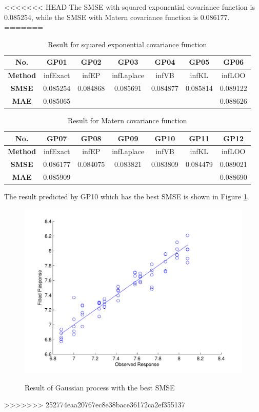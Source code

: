 \documentclass[a4paper]{article}
\begin{document}
<<<<<<< HEAD
The SMSE with squared exponential covariance function is 0.085254, while the SMSE with Matern covariance function is 0.086177.
=======
\begin{table}[h]
\centering
\begin{tabular}{|c|c|c|c|c|c|c|}
\hline
\textbf{No.} & GP01 & GP02 & GP03 & GP04 & GP05 & GP06 \\
\hline
\textbf{Method} & infExact & infEP & infLaplace & infVB & infKL & infLOO \\
\hline
\textbf{SMSE} & 0.085254 & 0.084868 & 0.085691 & 0.084877 & 0.085814 & 0.089122 \\
\hline
\textbf{MAE} & 0.085065 &  &  &  &  & 0.088626 \\
\hline
\end{tabular}
\caption{Result for squared exponential covariance function}\label{table1}
\end{table}
\begin{table}[h]
\centering
\begin{tabular}{|c|c|c|c|c|c|c|}
\hline
\textbf{No.} & GP07 & GP08 & GP09 & GP10 & GP11 & GP12 \\
\hline
\textbf{Method} & infExact & infEP & infLaplace & infVB & infKL & infLOO \\
\hline
\textbf{SMSE} & 0.086177 & 0.084075 & 0.083821 & 0.083809 & 0.084479 & 0.089021 \\
\hline
\textbf{MAE} & 0.085909 &  &  &  &  & 0.088690 \\
\hline
\end{tabular}
\caption{Result for Matern covariance function}\label{table2}
\end{table}

The result predicted by GP10 which has the best SMSE is shown in Figure \ref{pic9}.
\begin{figure}
  \centering
  \includegraphics[width=.6\textwidth]{images/predict_GP09.pdf}\\
  \caption{Result of Gaussian process with the best SMSE}\label{pic9}
\end{figure}
>>>>>>> 252774eaa20767ec8e38bace36172ca2ef355137


\end{document}
